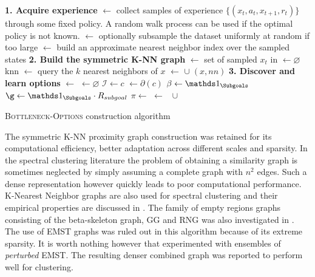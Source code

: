 \begin{algorithm}
\DontPrintSemicolon
{}
\;

\textbf{1. Acquire experience} \;
\Dataset $\leftarrow$ collect samples of experience $\{(x_t, a_t, x_{t+1}, r_{t})\}$ through some fixed policy. A random walk process can be used if the optimal policy is not known. \;
\Dataset $\leftarrow$ optionally subsample the dataset uniformly at random if too large\;
\Index $\leftarrow$ build an approximate nearest neighbor index over the sampled states\;
\;
\textbf{2. Build the symmetric K-NN graph}\;
\Vertices $\leftarrow $ set of sampled $x_t$ in \Dataset \;
\Edges $\leftarrow \varnothing$\;
 {
knn $\leftarrow$ query the $k$ nearest neighbors of $x$\;
   {
    \Edges $\leftarrow$ \Edges $\cup \; (x, nn)$\;
  }
}
\;
\textbf{3. Discover and learn options} \;
\Communities $\leftarrow$  \;
\Options $\leftarrow \varnothing$ \;
 {
  $\mathcal{I} \leftarrow c$\;
  \Subgoals $\leftarrow \partial(c)$\;
  $\beta \leftarrow \indicator_{\Subgoals}$ \;
   $\g \leftarrow \indicator_{\Subgoals}\cdot R_{subgoal}$\;
   $\pi \leftarrow$ \LearnMDP{\g} \;
   \Options $\leftarrow$ \Options $\; \cup \;$  \;
}
\Return \Options
\caption{\textsc{Bottleneck-Options} construction algorithm}
\label{alg:knnoptions}
\end{algorithm}

The symmetric K-NN proximity graph construction was retained for its computational efficiency, better adaptation across different scales and sparsity. In the spectral clustering literature the problem of obtaining a similarity graph is sometimes neglected by simply assuming a complete graph with $n^2$ edges. Such a dense representation however quickly leads to poor computational performance. K-Nearest Neighbor graphs are also used for spectral clustering and their empirical properties are  discussed in \cite{Luxburg2007}. The family of empty regions graphs consisting of the beta-skeleton graph, GG and RNG was also investigated in \cite{Correa2012}. The use of EMST graphs was ruled out in this algorithm because of its extreme sparsity. It is worth nothing however that \cite{Carreira2004} experimented with ensembles of \textit{perturbed} EMST. The resulting denser combined graph was reported to perform well for clustering.

